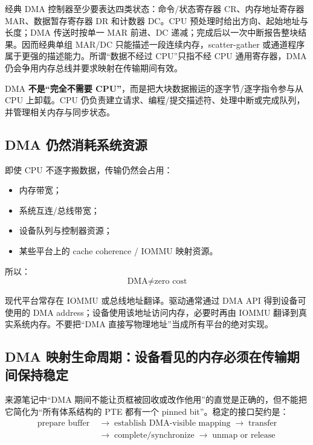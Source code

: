 \documentclass[UTF8,fontset=fandol,11pt,a4paper]{ctexart}
\newcommand{\kw}[1]{\textbf{#1}}
\newcommand{\arr}{\;\longrightarrow\;}
\begin{document}
经典 DMA 控制器至少要表达四类状态：命令/状态寄存器 CR、内存地址寄存器 MAR、数据暂存寄存器 DR 和计数器 DC。CPU 预处理时给出方向、起始地址与长度；DMA 传送时按单一 MAR 前进、DC 递减；完成后以一次中断报告整块结果。因而经典单组 MAR/DC 只能描述一段连续内存，scatter-gather 或通道程序属于更强的描述能力。所谓“数据不经过 CPU”只指不经 CPU 通用寄存器，DMA 仍会争用内存总线并要求映射在传输期间有效。

\begin{statebox}
DMA \kw{不是“完全不需要 CPU”}，而是把大块数据搬运的逐字节/逐字指令参与从 CPU 上卸载。CPU 仍负责建立请求、编程/提交描述符、处理中断或完成队列，并管理相关内存与同步状态。
\end{statebox}

\subsection{DMA 仍然消耗系统资源}
即使 CPU 不逐字搬数据，传输仍然会占用：
\begin{itemize}
  \item 内存带宽；
  \item 系统互连/总线带宽；
  \item 设备队列与控制器资源；
  \item 某些平台上的 cache coherence / IOMMU 映射资源。
\end{itemize}
所以：
\[
\boxed{\text{DMA}\neq\text{zero cost}}
\]

\begin{eng}
现代平台常存在 IOMMU 或总线地址翻译。驱动通常通过 DMA API 得到设备可使用的 DMA address；设备使用该地址访问内存，必要时再由 IOMMU 翻译到真实系统内存。不要把“DMA 直接写物理地址”当成所有平台的绝对实现。
\end{eng}

\subsection{DMA 映射生命周期：设备看见的内存必须在传输期间保持稳定}

来源笔记中“DMA 期间不能让页框被回收或改作他用”的直觉是正确的，但不能把它简化为“所有体系结构的 PTE 都有一个 pinned bit”。稳定的接口契约是：
\[
\boxed{
\begin{aligned}
\text{prepare buffer}
&\arr\text{establish DMA-visible mapping}
\arr\text{transfer}\\
&\arr\text{complete/synchronize}
\arr\text{unmap or release}
\end{aligned}
}
\]
\end{document}
